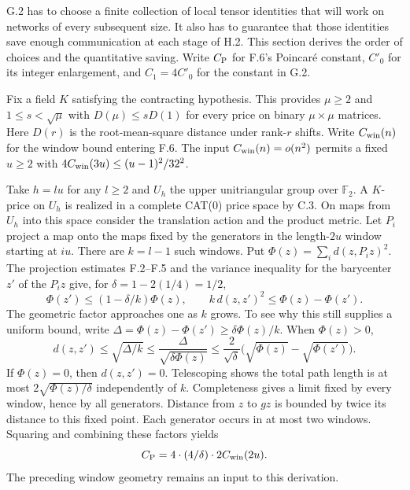 \newpage
{}\label{sec:gain}
\label{pass13b-gain}
G.2 has to choose a finite collection of local tensor identities that will work on networks of every subsequent size. It also has to guarantee that those identities save enough communication at each stage of H.2. This section derives the order of choices and the quantitative saving. Write $C_{\rm P}$ for F.6's Poincaré constant, $C'_0$ for its integer enlargement, and $C_1=4C'_0$ for the constant in G.2.

Fix a field $K$ satisfying the contracting hypothesis. This provides $\mu\ge2$ and $1\le s<\sqrt\mu$ with $D(\mu)\le sD(1)$ for every price on binary $\mu\times\mu$ matrices. Here $D(r)$ is the root-mean-square distance under rank-$r$ shifts. Write $C_{\rm win}(n)$ for the window bound entering F.6. The input $C_{\rm win}(n)=o(n^2)$ permits a fixed $u\ge2$ with $4C_{\rm win}(3u)\le(u-1)^2/32^2$.

Take $h=lu$ for any $l\ge2$ and $U_h$ the upper unitriangular group over $\mathbb F_2$. A $K$-price on $U_h$ is realized in a complete CAT(0) price space by C.3. On maps from $U_h$ into this space consider the translation action and the product metric. Let $P_i$ project a map onto the maps fixed by the generators in the length-$2u$ window starting at $iu$. There are $k=l-1$ such windows. Put $\Phi(z)=\sum_i d(z,P_i z)^2$. The projection estimates F.2--F.5 and the variance inequality for the barycenter $z'$ of the $P_i z$ give, for $\delta=1-2(1/4)=1/2$,
\[
 \Phi(z')\le(1-\delta/k)\Phi(z),\qquad
 k\,d(z,z')^2\le\Phi(z)-\Phi(z').
\]
The geometric factor approaches one as $k$ grows. To see why this still supplies a uniform bound, write $\Delta=\Phi(z)-\Phi(z')\ge\delta\Phi(z)/k$. When $\Phi(z)>0$,
\[
 d(z,z')\le\sqrt{\Delta/k}\le\frac{\Delta}{\sqrt{\delta\Phi(z)}}
 \le\frac{2}{\sqrt\delta}\bigl(\sqrt{\Phi(z)}-\sqrt{\Phi(z')}\bigr).
\]
If $\Phi(z)=0$, then $d(z,z')=0$. Telescoping shows the total path length is at most $2\sqrt{\Phi(z)/\delta}$ independently of $k$. Completeness gives a limit fixed by every window, hence by all generators. Distance from $z$ to $gz$ is bounded by twice its distance to this fixed point. Each generator occurs in at most two windows. Squaring and combining these factors yields
\[
 C_{\rm P}=4\cdot(4/\delta)\cdot2C_{\rm win}(2u).
\]
The preceding window geometry remains an input to this derivation.


